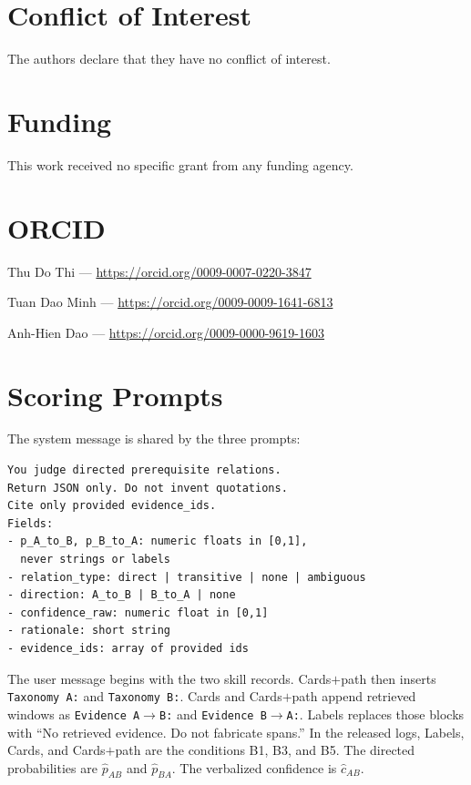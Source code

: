\documentclass{ws-ijait}
\newcommand{\phat}{\hat{p}}
\newcommand{\chat}{\hat{c}}
\begin{document}
\section*{Conflict of Interest}
The authors declare that they have no conflict of interest.

\section*{Funding}
This work received no specific grant from any funding agency.

\section*{ORCID}
Thu Do Thi --- \url{https://orcid.org/0009-0007-0220-3847}

\noindent Tuan Dao Minh --- \url{https://orcid.org/0009-0009-1641-6813}

\noindent Anh-Hien Dao --- \url{https://orcid.org/0009-0000-9619-1603}

\appendix
\section{Scoring Prompts}
\label{app:prompts}
The system message is shared by the three prompts:
\begin{verbatim}
You judge directed prerequisite relations.
Return JSON only. Do not invent quotations.
Cite only provided evidence_ids.
Fields:
- p_A_to_B, p_B_to_A: numeric floats in [0,1],
  never strings or labels
- relation_type: direct | transitive | none | ambiguous
- direction: A_to_B | B_to_A | none
- confidence_raw: numeric float in [0,1]
- rationale: short string
- evidence_ids: array of provided ids
\end{verbatim}
The user message begins with the two skill records.
Cards$+$path then inserts \texttt{Taxonomy A:} and
\texttt{Taxonomy B:}.
Cards and Cards$+$path append retrieved windows as
\texttt{Evidence A$\to$B:} and \texttt{Evidence B$\to$A:}.
Labels replaces those blocks with ``No retrieved evidence.
Do not fabricate spans.''
In the released logs, Labels, Cards, and Cards$+$path are the
conditions B1, B3, and B5.
The directed probabilities are $\phat_{AB}$ and $\phat_{BA}$.
The verbalized confidence is $\chat_{AB}$.
\end{document}
